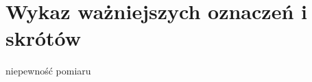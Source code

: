 \chapter*{Wykaz ważniejszych oznaczeń i skrótów}

\begin{abbrev}
\item[e] niepewność pomiaru
\end{abbrev}

